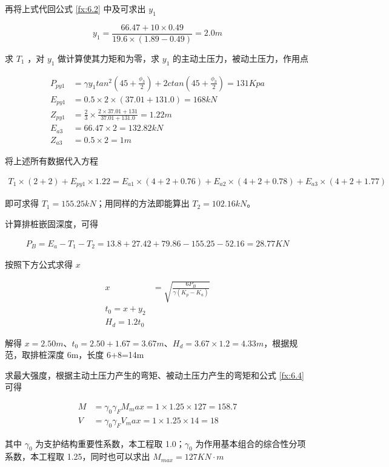 再将上式代回公式 \ref{fx:6.2} 中及可求出 $y_1$

\[y_1=\frac{66.47+10\times 0.49}{19.6\times(1.89-0.49)}=2.0 m\]

求 $T_1$ ，对 $y_1$ 做计算使其力矩和为零，求 $y_1$ 的主动土压力，被动土压力，作用点

\begin{align*}
    P_{py1}&=\gamma y_1tan^2(45+\frac{\phi_3}{2})+2ctan(45+\frac{\phi_3}{2})=131 Kpa\\
    E_{py1}&=0.5\times 2\times(37.01+131.0)=168 kN\\
    Z_{py1}&=\frac{2}{3}\times \frac{2\times 37.01+131}{37.01+131.0}=1.22 m\\
    E_{a3}&=66.47\times 2=132.82 kN\\
    Z_{a3}&=0.5\times 2=1 m
\end{align*}

将上述所有数据代入方程

\begin{align*}
T_1\times(2+2)+E_{py1}\times 1.22=E_{a1}\times(4+2+0.76)+E_{a2}\times(4+2+0.78)+E_{a3}\times(4+2+1.77)
\end{align*}

即可求得 $T_1=155.25kN$；用同样的方法即能算出 $T_2=102.16kN$。

计算排桩嵌固深度，可得

\begin{align*}
    P_B=E_a-T_1-T_2=13.8+27.42+79.86-155.25-52.16=28.77 KN
\end{align*}

按照下方公式求得 $x$

\begin{align}
    x&=\sqrt{\frac{6P_B}{\gamma (K_p-K_a)}}\\
    t_0=x+y_2\\
    H_d=1.2t_0
\end{align}

解得 $x=2.50m$、$t_0=2.50+1.67=3.67m$、$H_d=3.67\times 1.2=4.33m$，根据规范，取排桩深度 6m，长度 6+8=14m

求最大强度，根据主动土压力产生的弯矩、被动土压力产生的弯矩和公式 \ref{fx:6.4} 可得

\begin{align}
    \label{fx:6.4}
    M&=\gamma_0\gamma_FM_max=1\times 1.25\times 127=158.7\\
    V&=\gamma_0\gamma_FV_max=1\times 1.25\times 14=18
\end{align}

其中 $\gamma_0$ 为支护结构重要性系数，本工程取 1.0；$\gamma_0$ 为作用基本组合的综合性分项系数，本工程取 1.25，同时也可以求出
$M_{max}=127KN\cdot m$\\

